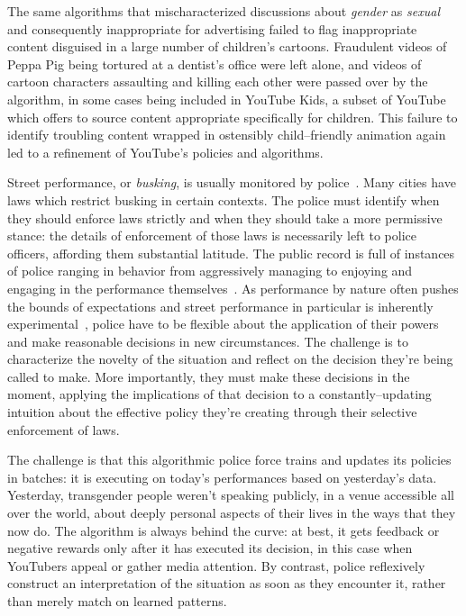 \documentclass[main]{subfiles}
\begin{document}
The same algorithms that mischaracterized discussions about
\textit{gender} as \textit{sexual} and consequently inappropriate for advertising
failed to flag
inappropriate content disguised in a large number of children's cartoons.
Fraudulent videos of Peppa Pig being tortured at a dentist's office were left alone, and
videos of cartoon characters assaulting and killing each other were passed over by the algorithm,
in some cases being included in YouTube Kids,
a subset of YouTube which offers to source content appropriate specifically for children.
This failure to identify troubling content wrapped in
ostensibly child--friendly animation
again led to a refinement of YouTube's policies and algorithms.

Street performance, or \textit{busking}, is usually monitored by police~\cite{quilter2015long}.
Many cities have laws which restrict busking in certain contexts.
The police must identify when they should enforce laws strictly and when they should take a more permissive stance:
the details of enforcement of those laws is necessarily left to police officers,
affording them substantial latitude.
The public record is full of instances of police ranging in behavior from
aggressively managing to enjoying and engaging in the performance themselves~\cite{grill2011street}.
As performance by nature often pushes the bounds of expectations and
street performance in particular is inherently experimental~\cite{harrison1990drawing},
police have to be flexible about the application of their powers and make reasonable decisions in new circumstances.
The challenge is to characterize the novelty of the situation and reflect on the decision they're being called to make.
More importantly, they must make these decisions in the moment,
applying the implications of that decision to a constantly--updating intuition about
the effective policy they're creating through their selective enforcement of laws.

The challenge is that this algorithmic police force trains and updates its policies in batches:
it is executing on today's performances based on yesterday's data.
Yesterday, transgender people weren't speaking publicly,
in a venue accessible all over the world,
about deeply personal aspects of their lives in the ways that they now do.
The algorithm is always behind the curve:
at best, it gets feedback or negative rewards
only after it has executed its decision,
in this case when YouTubers appeal or gather media attention.
By contrast, police reflexively construct
an interpretation of the situation as soon as they encounter it,
rather than merely match on learned patterns.
\end{document}
